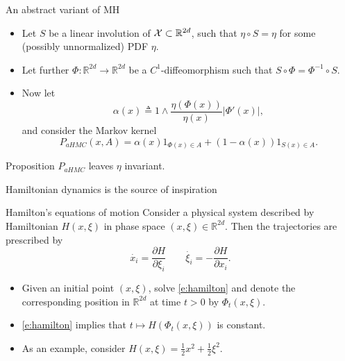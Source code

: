 \documentclass[10pt]{beamer}
\begin{document}
\begin{frame}{An abstract variant of MH}
\begin{itemize}
  \item Let $S$ be a linear involution of $\mathcal{X}\subset\mathbb{R}^{2d}$, such that $\eta\circ S = \eta$ for some (possibly unnormalized) PDF $\eta$.
  \item Let further $\Phi:\mathbb{R}^{2d}\rightarrow \mathbb{R}^{2d}$ be a $C^1$-diffeomorphism such that $S\circ \Phi = \Phi^{-1}\circ S$.
  \item Now let 
\begin{equation}
    \label{e:acceptance_probability_abstract_HMC}
    \alpha(x) \triangleq 1\wedge \frac{\eta(\Phi(x))}{\eta(x)} \vert\Phi'(x)\vert,
\end{equation}
and consider the Markov kernel
$$
P_{aHMC}(x,A) = \alpha(x) 1_{\Phi(x)\in A} + (1-\alpha(x))1_{S(x)\in A}.
$$
\end{itemize}
\begin{block}{Proposition}
$P_{aHMC}$ leaves $\eta$ invariant.
\end{block}
\end{frame}

\begin{frame}{Hamiltonian dynamics is the source of inspiration}
\begin{block}{Hamilton's equations of motion}
Consider a physical system described by Hamiltonian $H(x,\xi)$ in phase space $(x,\xi)\in \mathbb{R}^{2d}$. Then the trajectories are prescribed by
\begin{equation}
  \label{e:hamilton}
  \dot{x_i} = \frac{\partial H}{\partial \xi_i} \qquad \dot{\xi_i} = -\frac{\partial H}{\partial x_i}.
\end{equation}
\end{block}
\begin{itemize}
  \item Given an initial point $(x,\xi)$, solve \eqref{e:hamilton} and denote the corresponding position in $\mathbb{R}^{2d}$ at time $t>0$ by $\Phi_t(x,\xi)$.
  \item \eqref{e:hamilton} implies that $t\mapsto H(\Phi_t(x,\xi))$ is constant.
  \item As an example, consider $H(x,\xi) = \frac12 x^2 + \frac12 \xi^2.$
\end{itemize}
\blank
\end{frame}
\end{document}
